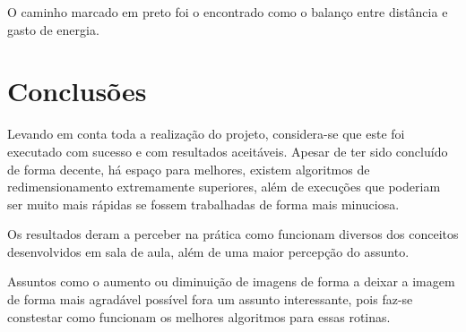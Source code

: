 \documentclass[conference]{IEEEtran}
\begin{document}
O caminho marcado em preto foi o encontrado como o balanço entre distância
e gasto de energia.

\section{Conclusões}

Levando em conta toda a realização do projeto, considera-se que este foi 
executado com sucesso e com resultados aceitáveis. Apesar de ter sido concluído
de forma decente, há espaço para melhores, existem algoritmos de redimensionamento
extremamente superiores, além de execuções que poderiam ser muito mais rápidas
se fossem trabalhadas de forma mais minuciosa.

Os resultados deram a perceber na prática como funcionam diversos dos conceitos
desenvolvidos em sala de aula, além de uma maior percepção do assunto.

Assuntos como o aumento ou diminuição de imagens de forma a deixar a imagem
de forma mais agradável possível fora um assunto interessante, pois faz-se constestar
como funcionam os melhores algoritmos para essas rotinas.












\end{document}
